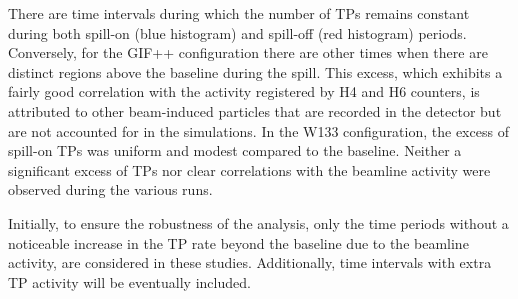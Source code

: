 There are time intervals during which the number of TPs remains constant during both spill-on (blue histogram) and spill-off (red histogram) periods. Conversely, for the GIF++ configuration there are other times when there are distinct regions above the baseline during the spill. This excess, which exhibits a fairly good correlation with the activity registered by H4 and H6 counters, is attributed to other beam-induced particles that are recorded in the detector but are not accounted for in the simulations. In the W133 configuration, the excess of spill-on TPs was uniform and modest compared to the baseline. Neither a significant excess of TPs nor clear correlations with the beamline activity were observed during the various runs.

Initially, to ensure the robustness of the analysis, only the time periods without a noticeable increase in the TP rate beyond the baseline due to the beamline activity, are considered in these studies. Additionally, time intervals with extra TP activity will be eventually included. %




